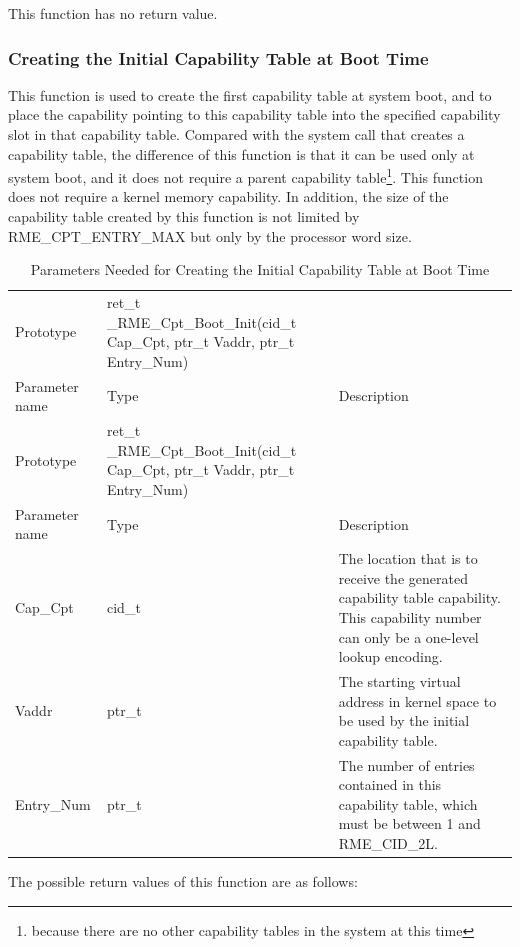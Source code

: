 This function has no return value.

\subsubsection{Creating the Initial Capability Table at Boot Time}\label{subsubsec:7-create-initial-capability-table-at-boot}

This function is used to create the first capability table at system boot, and to place the capability pointing to this capability table into the specified capability slot in that capability table. Compared with the system call that creates a capability table, the difference of this function is that it can be used only at system boot, and it does not require a parent capability table\footnote{because there are no other capability tables in the system at this time}. This function does not require a kernel memory capability. In addition, the size of the capability table created by this function is not limited by RME\_CPT\_ENTRY\_MAX but only by the processor word size.

\begin{xltabular}{\textwidth}{@{}>{\hsize\raggedright\arraybackslash}X>{\hsize\raggedright\arraybackslash}X>{\hsize\raggedright\arraybackslash}X@{}}
\caption{Parameters Needed for Creating the Initial Capability Table at Boot Time}\label{tab:7-41-create-initial-capability-table-at-boot-parameters}\\
\toprule
Prototype & ret\_t \_RME\_Cpt\_Boot\_Init(cid\_t Cap\_Cpt, ptr\_t Vaddr,
ptr\_t Entry\_Num) &\tabularnewline
Parameter name & Type & Description\tabularnewline
\endfirsthead
\toprule
Prototype & ret\_t \_RME\_Cpt\_Boot\_Init(cid\_t Cap\_Cpt, ptr\_t Vaddr,
ptr\_t Entry\_Num) &\tabularnewline
Parameter name & Type & Description\tabularnewline
\midrule
\endhead
\bottomrule
\endlastfoot
Cap\_Cpt & cid\_t &
The location that is to receive the generated capability table capability. This capability number can only be a one-level lookup encoding.\tabularnewline
Vaddr & ptr\_t & The starting virtual address in kernel space to be used by the initial capability table.\tabularnewline
Entry\_Num & ptr\_t &
The number of entries contained in this capability table, which must be between 1 and RME\_CID\_2L.\tabularnewline
\end{xltabular}
\nopagebreak[4]

The possible return values of this function are as follows:

